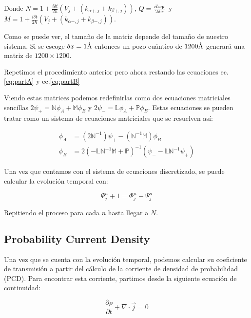 \noindent Donde $N =1 + \frac{i\delta t}{2\hbar} \left( V_j + \left(k_{\alpha+,j}+k_{\beta+,j}\right)\right)$, $Q=\frac{i\hbar v_{\mbox{\tiny F}}}{2\delta x}$ y $M =1 + \frac{i\delta t}{2\hbar}\left( V_j + \left(k_{\alpha-,j}+k_{\beta-,j}\right)\right)$.

Como se puede ver, el tamaño de la matriz depende del tamaño de nuestro sistema.
Si se escoge $\delta x = 1\textup{\AA}$ entonces un pozo cuántico de $1200\textup{\AA}$ generará una matriz de $1200\times1200$.

Repetimos el procedimiento anterior pero ahora restando las ecuaciones ec.\eqref{eq:partA} y ec.\eqref{eq:partB}

Viendo estas matrices podemos redefinirlas como dos ecuaciones matriciales sencillas $2\psi_+=\mathbb{N}\phi_A+\mathbb{M}\phi_B$ y $2\psi_-=\mathbb{L}\phi_A+\mathbb{P}\phi_B$.
Estas ecuaciones se pueden tratar como un sistema de ecuaciones matriciales que se resuelven así:

\begin{align}
    \label{eq:sistemaMatricial}
    \phi_A&=(2\mathbb{N}^{-1})\psi_+-(\mathbb{N}^{-1}\mathbb{M})\phi_B\nonumber\\
    \phi_B&=2(-\mathbb{L}\mathbb{N}^{-1}\mathbb{M}+\mathbb{P})^{-1}(\psi_--\mathbb{L}\mathbb{N}^{-1}\psi_+)
\end{align}

Una vez que contamos con el sistema de ecuaciones discretizado, se puede calcular la evolución temporal con:

\begin{equation}
    \label{eq:siguienteTiempo}
    \Psi_j^n+1=\Phi_j^n-\Psi_j^n
\end{equation}

Repitiendo el proceso para cada $n$ hasta llegar a $N$.


\subsection{Probability Current Density}\label{subsec:probability-current-density}

Una vez que se cuenta con la evolución temporal, podemos calcular su coeficiente de transmisión a partir del cálculo de la corriente de densidad de probabilidad (PCD).
Para encontrar esta corriente, partimos desde la siguiente ecuación de continuidad:

\begin{equation}
    \label{eq:continuidad}
    \frac{\partial\rho}{\partial t} + \nabla\cdot\vec{j}=0
\end{equation}

